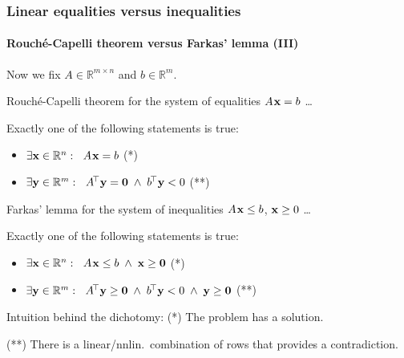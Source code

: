 \documentclass{beamer}
\renewcommand{\.}{\hskip .75pt}
\DeclareMathOperator{\aand}{~\wedge~}
\begin{document}
\begin{frame}
\frametitle{Linear equalities versus inequalities}
\framesubtitle{Rouché-Capelli theorem versus Farkas' lemma (III)}

	Now we fix $A \in \mathbb{R}^{m \times n}$ and $b \in \mathbb{R}^{m}$.
	\bigskip
	
	{ \color{dred}
		Rouché-Capelli theorem for the system of equalities $A\. \bold{x} = b$ \dots
		
		Exactly one of the following statements is true:
	}
	\begin{itemize} \color{dred}
		\item $\exists \bold{x} \in \mathbb{R}^{n} : \ \; A\. \bold{x} = b$ \hfill\hbox{\footnotesize(*)\:\qquad}
		\item $\exists \bold{y} \in \mathbb{R}^{m} : \ \; A^{\!\top} \bold{y} = \bold{0} \aand b^{\!\top} \bold{y} < 0$ \hfill\hbox{\footnotesize(**)\qquad}
	\end{itemize}
	\medskip
	
	{ \color{dblue}
		Farkas' lemma for the system of inequalities $A\. \bold{x} \le b$, $\bold{x} \ge 0$ \dots
		
		Exactly one of the following statements is true:
	}
	\begin{itemize} \color{dblue}
		\item $\exists \bold{x} \in \mathbb{R}^{n} : \ \; A\. \bold{x} \le b \aand \bold{x} \ge \bold{0}$ \hfill\hbox{\footnotesize(*)\:\qquad}
		\item $\exists \bold{y} \in \mathbb{R}^{m} : \ \; A^{\!\top} \bold{y} \ge \bold{0} \aand b^{\!\top} \bold{y} < 0 \aand \bold{y} \ge \bold{0}$ \hfill\hbox{\footnotesize(**)\qquad}
	\end{itemize}
	\medskip
	
	\footnotesize Intuition behind the dichotomy:\qquad
	(*) The problem has a solution.
	
	(**) There is a linear/nnlin.~combination of rows that provides a contradiction.

\end{frame}
\end{document}
